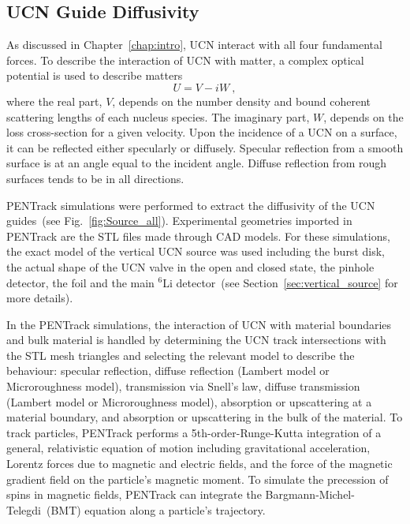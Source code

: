 \subsection{UCN Guide Diffusivity\label{sec:diffusivity}}
As discussed in Chapter~\ref{chap:intro}, UCN interact with all four
fundamental forces. To describe the interaction of UCN with matter, a
complex optical potential is used to describe matters
\begin{equation}
  \label{eqn:fermipotential}
  U = V - iW~,
\end{equation}
where the real part, $V$, depends on the number density and bound
coherent scattering lengths of each nucleus species. The imaginary
part, $W$, depends on the loss cross-section for a given velocity.
Upon the incidence of a UCN on a surface, it can be reflected either
specularly or diffusely. Specular reflection from a smooth surface is
at an angle equal to the incident angle. Diffuse reflection from rough
surfaces tends to be in all directions.

PENTrack simulations were performed to extract the diffusivity of the
UCN guides~(see Fig.~\ref{fig:Source_all}). Experimental geometries
imported in PENTrack are the STL files made through CAD models. For
these simulations, the exact model of the vertical UCN source was used
including the burst disk, the actual shape of the UCN valve in the
open and closed state, the pinhole detector, the foil and the main
$^6$Li detector~(see Section~\ref{sec:vertical_source} for more
details).



In the PENTrack simulations, the interaction of UCN with material
boundaries and bulk material is handled by determining the UCN track
intersections with the STL mesh triangles and selecting the relevant
model to describe the behaviour: specular reflection, diffuse
reflection (Lambert model or Microroughness model), transmission via
Snell's law, diffuse transmission (Lambert model or Microroughness
model), absorption or upscattering at a material boundary, and
absorption or upscattering in the bulk of the material. To track
particles, PENTrack performs a 5th-order-Runge-Kutta integration of a
general, relativistic equation of motion including gravitational
acceleration, Lorentz forces due to magnetic and electric fields, and
the force of the magnetic gradient field on the particle’s magnetic
moment. To simulate the precession of spins in magnetic fields,
PENTrack can integrate the Bargmann-Michel-Telegdi~(BMT) equation
along a particle’s trajectory.

